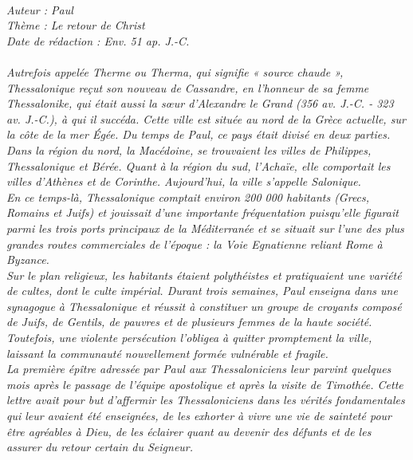 \BFont
\noindent\hrulefill
{\footnotesize
\textit{
\bigskip
{\centering{}
\\Auteur : Paul
\\Thème : Le retour de Christ
\\Date de rédaction : Env. 51 ap. J.-C.\\}
}
\textit{
\\Autrefois appelée Therme ou Therma, qui signifie « source chaude », Thessalonique reçut son nouveau de Cassandre, en l’honneur de sa femme Thessalonike, qui était aussi la sœur d’Alexandre le Grand (356 av. J.-C. - 323 av. J.-C.), à qui il succéda. Cette ville est située au nord de la Grèce actuelle, sur la côte de la mer Égée.  Du temps de Paul, ce pays était divisé en deux parties. Dans la région du nord, la Macédoine, se trouvaient les villes de Philippes, Thessalonique et Bérée. Quant à la région du sud, l’Achaïe, elle comportait les villes d’Athènes et de Corinthe. Aujourd’hui, la ville s’appelle Salonique.
\\En ce temps-là, Thessalonique comptait environ 200 000 habitants (Grecs, Romains et Juifs) et jouissait d’une importante fréquentation puisqu’elle figurait parmi les trois ports principaux de la Méditerranée et se situait sur l’une des plus grandes routes commerciales de l’époque : la Voie Egnatienne reliant Rome à Byzance.
\\Sur le plan religieux, les habitants étaient polythéistes et pratiquaient une variété de cultes, dont le culte impérial. Durant trois semaines, Paul enseigna dans une synagogue à Thessalonique et réussit à constituer un groupe de  croyants composé de Juifs, de Gentils, de pauvres et de plusieurs femmes de la haute société. Toutefois, une violente persécution l’obligea à quitter promptement la ville, laissant la communauté nouvellement formée vulnérable et fragile.
\\La première épître adressée par Paul aux Thessaloniciens leur parvint quelques mois après le passage de l’équipe apostolique et après la visite de Timothée. Cette lettre avait pour but d’affermir les Thessaloniciens dans les vérités fondamentales qui leur avaient été enseignées, de les exhorter à vivre une vie de sainteté pour être agréables à Dieu, de les éclairer quant au devenir des défunts et de les assurer du retour certain du Seigneur.\bigskip
}
}
\par\nobreak\noindent\hrulefill
